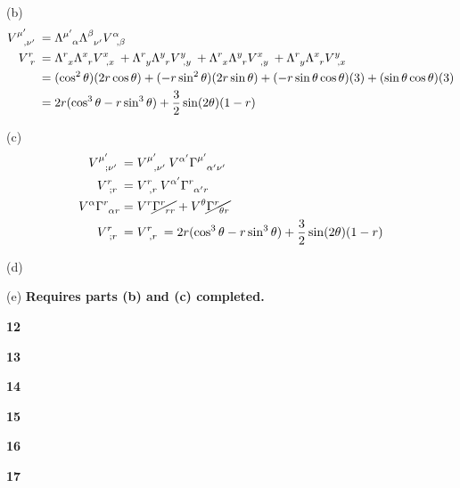 \documentclass[gr-notes.tex]{subfiles}
\begin{document}
(b)
\begin{align*}
  \tensor{V}{^{\mu'}_{,\nu'}} &=
  \tensor{\Lambda}{^{\mu'}_\alpha}
  \tensor{\Lambda}{^\beta_{\nu'}}
  \tensor{V}{^\alpha_{,\beta}}
  \\
  \tensor{V}{^r_r} &=
  \tensor{\Lambda}{^r_x} \tensor{\Lambda}{^x_r} \tensor{V}{^x_{,x}} +
  \tensor{\Lambda}{^r_y} \tensor{\Lambda}{^y_r} \tensor{V}{^y_{,y}} +
  \tensor{\Lambda}{^r_x} \tensor{\Lambda}{^y_r} \tensor{V}{^x_{,y}} +
  \tensor{\Lambda}{^r_y} \tensor{\Lambda}{^x_r} \tensor{V}{^y_{,x}}
  \\ &=
  (\cos^2\theta) (2r \cos\theta) +
  (-r \sin^2\theta) (2r \sin\theta) +
  (-r \sin\theta \cos\theta) (3) +
  (\sin\theta \cos\theta) (3)
  \\ &=
  2r (\cos^3\theta - r \sin^3\theta) +
  \frac{3}{2} \sin(2\theta) (1 - r)
\end{align*}


(c)
\begin{align*}
  \tensor{V}{^{\mu'}_{;\nu'}} &=
  \tensor{V}{^{\mu'}_{,\nu'}}
  \tensor{V}{^{\alpha'}} \tensor{\Gamma}{^{\mu'}_{\alpha'\nu'}}
  \\
  \tensor{V}{^r_{;r}} &=
  \tensor{V}{^r_{,r}}
  \tensor{V}{^{\alpha'}} \tensor{\Gamma}{^{r}_{\alpha'r}}
  \\
  \tensor{V}{^\alpha} \tensor{\Gamma}{^r_{\alpha r}} &=
  V^r     \cancel{\tensor{\Gamma}{^r_{rr}}} +
  V^\theta \cancel{\tensor{\Gamma}{^r_{\theta r}}}
  \\
  \tensor{V}{^r_{;r}} &=
  \tensor{V}{^r_{,r}} =
  2r (\cos^3\theta - r \sin^3\theta) +
  \frac{3}{2} \sin(2\theta) (1 - r)
\end{align*}


(d)





(e)
\textbf{Requires parts (b) and (c) completed.}



\textbf{12}

\textbf{13}

\textbf{14}

\textbf{15}

\textbf{16}

\textbf{17}
\end{document}
